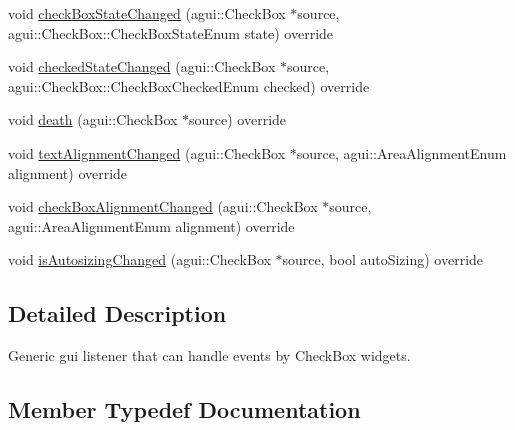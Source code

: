 \begin{DoxyCompactItemize}
\item 
void \mbox{\hyperlink{classec_1_1_generic_check_box_listener_ae21003432ad938518b2f399e02689a5b}{check\+Box\+State\+Changed}} (agui\+::\+Check\+Box $\ast$source, agui\+::\+Check\+Box\+::\+Check\+Box\+State\+Enum state) override
\item 
void \mbox{\hyperlink{classec_1_1_generic_check_box_listener_a861ff5c1597ab9ef90ec051b2ddc90a1}{checked\+State\+Changed}} (agui\+::\+Check\+Box $\ast$source, agui\+::\+Check\+Box\+::\+Check\+Box\+Checked\+Enum checked) override
\item 
void \mbox{\hyperlink{classec_1_1_generic_check_box_listener_af002391270c8aa8cbc1cc8a04d6a3b19}{death}} (agui\+::\+Check\+Box $\ast$source) override
\item 
void \mbox{\hyperlink{classec_1_1_generic_check_box_listener_abe00afb238e730d9e88c14e540f209ca}{text\+Alignment\+Changed}} (agui\+::\+Check\+Box $\ast$source, agui\+::\+Area\+Alignment\+Enum alignment) override
\item 
void \mbox{\hyperlink{classec_1_1_generic_check_box_listener_a231cf0b48aa2dd71f9781993e90817ff}{check\+Box\+Alignment\+Changed}} (agui\+::\+Check\+Box $\ast$source, agui\+::\+Area\+Alignment\+Enum alignment) override
\item 
void \mbox{\hyperlink{classec_1_1_generic_check_box_listener_a94be6628b6da23836531acaf4c3eecbc}{is\+Autosizing\+Changed}} (agui\+::\+Check\+Box $\ast$source, bool auto\+Sizing) override
\end{DoxyCompactItemize}


\subsection{Detailed Description}
Generic gui listener that can handle events by Check\+Box widgets. 

\subsection{Member Typedef Documentation}
\mbox{\label{classec_1_1_generic_check_box_listener_a9b20541580dce7b3a1818b62524d2c6a}} 
